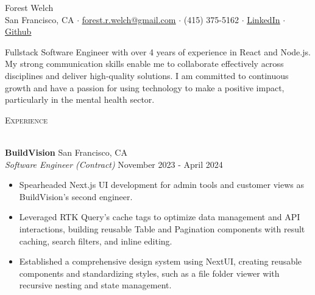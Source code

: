 \documentclass[a4paper]{article}
\newcommand{\header} [1] {
    {\hspace*{-18pt}\vspace*{3pt} \textcolor{deeppurple}{\textsc{#1}}}
    \vspace*{-12pt} \\
    \hspace*{-18pt} \textcolor{deeppurple}{\hrulefill} \\
}
\begin{document}
\vspace{-40pt}

\begin{center}
    {\fontsize{36}{36}\selectfont \textcolor{deeppurple}{Forest Welch}} \\ %
    \vspace{10pt} %
    \small San Francisco, CA $\cdot$ \href{mailto:forest.r.welch@gmail.com}{\underline{forest.r.welch@gmail.com}} $\cdot$ (415) 375-5162 $\cdot$ \href{https://linkedin.com/in/forestrwelch}{\underline{LinkedIn}} $\cdot$ \href{https://github.com/nwelchr}{\underline{Github}}
\end{center}

\vspace{10pt}

Fullstack Software Engineer with over 4 years of experience in React and Node.js. My strong communication skills enable me to collaborate effectively across disciplines and deliver high-quality solutions. I am committed to continuous growth and have a passion for using technology to make a positive impact, particularly in the mental health sector.

\vspace{10pt}

\header{Experience}
\vspace{1mm}

\textbf{BuildVision} \hfill San Francisco, CA\\
\textit{Software Engineer (Contract)} \hfill November 2023 - April 2024\\
\vspace{-1mm}
\begin{itemize} \itemsep .5pt
    \item Spearheaded Next.js UI development for admin tools and customer views as BuildVision's second engineer.
    \item Leveraged RTK Query's cache tags to optimize data management and API interactions, building reusable Table and Pagination components with result caching, search filters, and inline editing.
    \item Established a comprehensive design system using NextUI, creating reusable components and standardizing styles, such as a file folder viewer with recursive nesting and state management.
\end{itemize}
\end{document}
